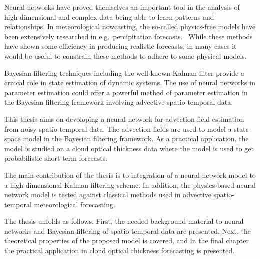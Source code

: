 Neural networks have proved themselves an important tool in the analysis of high-dimensional and complex data being able to learn patterns and relationships.
In meteorological nowcasting, the so-called physics-free models have been extensively researched in e.g.\ percipitation forecasts.~\cite{rainnet, metnet}
While these methods have shown some efficiency in producing realistic forecasts, in many cases it would be useful to constrain these methods to adhere to some physical models.

Bayesian filtering techniques including the well-known Kalman filter provide a cruical role in state estimation of dynamic systems.
The use of neural networks in parameter estimation could offer a powerful method of parameter estimation in the Bayesian filtering framework involving advective spatio-temporal data.

This thesis aims on devoloping a neural network for advection field estimation from noisy spatio-temporal data.
The advection fields are used to model a state-space model in the Bayesian filtering framework.
As a practical application, the model is studied on a cloud optical thickness data where the model is used to get probabilistic short-term forecasts.

The main contribution of the thesis is to integration of a neural network model to a high-dimensional Kalman filtering scheme.
In addition, the physics-based neural network model is tested against classical methods used in advective spatio-temporal meteorological forecasting.

The thesis unfolds as follows.
First, the needed background material to neural networks and Bayesian filtering of spatio-temporal data are presented.
Next, the theoretical properties of the proposed model is covered, and in the final chapter the practical application in cloud optical thickness forecasting is presented.
